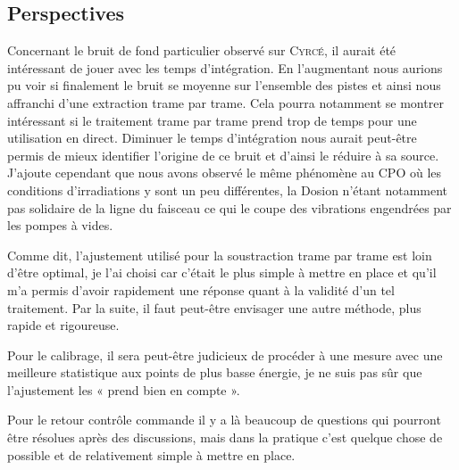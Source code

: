 \documentclass[a4paper,11pt]{article}
\newcommand{\cyrce}{\textsc{Cyrcé}}
\begin{document}
\subsection*{Perspectives}
Concernant le bruit de fond particulier observé sur \cyrce , il aurait été intéressant de jouer avec les temps d’intégration. 
En l’augmentant nous aurions pu voir si finalement le bruit se moyenne sur l’ensemble des pistes et ainsi nous affranchi d’une extraction trame par trame. 
Cela pourra notamment se montrer intéressant si le traitement trame par trame prend trop de temps pour une utilisation en direct. 
Diminuer le temps d’intégration nous aurait peut-être permis de mieux identifier l’origine de ce bruit et d’ainsi le réduire à sa source.
J'ajoute cependant que nous avons observé le même phénomène au CPO où les conditions d'irradiations y sont un peu différentes, la Dosion n'étant notamment pas solidaire de la ligne du faisceau ce qui le coupe des vibrations engendrées par les pompes à vides.

Comme dit, l’ajustement utilisé pour la soustraction trame par trame est loin d’être optimal, je l'ai choisi car c’était le plus simple à mettre en place et qu’il m’a permis d’avoir rapidement une réponse quant à la validité d’un tel traitement. 
Par la suite, il faut peut-être envisager une autre méthode, plus rapide et rigoureuse.

Pour le calibrage, il sera peut-être judicieux de procéder à une mesure avec une meilleure statistique aux points de plus basse énergie, je ne suis pas sûr que l’ajustement les « prend bien en compte ».

Pour le retour contrôle commande il y a là beaucoup de questions qui pourront être résolues après des discussions, mais dans la pratique c’est quelque chose de possible et de relativement simple à mettre en place.

\end{document}
